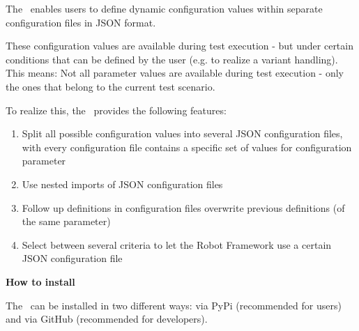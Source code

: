 %



%

The \pkg\ enables users to define dynamic configuration values within separate configuration files in JSON format.

These configuration values are available during test execution - but under certain conditions that can be defined by the user
(e.g. to realize a variant handling). This means: Not all parameter values are available during test execution - only the ones
that belong to the current test scenario.

To realize this, the \pkg\ provides the following features:

\begin{enumerate}
   \item Split all possible configuration values into several JSON configuration files, with every configuration file contains a specific
         set of values for configuration parameter
   \item Use nested imports of JSON configuration files
   \item Follow up definitions in configuration files overwrite previous definitions (of the same parameter)
   \item Select between several criteria to let the Robot Framework use a certain JSON configuration file
\end{enumerate}

\vspace{2ex}

\textbf{How to install}

\vspace{2ex}

The \pkg\ can be installed in two different ways: via PyPi (recommended for users) and via GitHub (recommended for developers).

